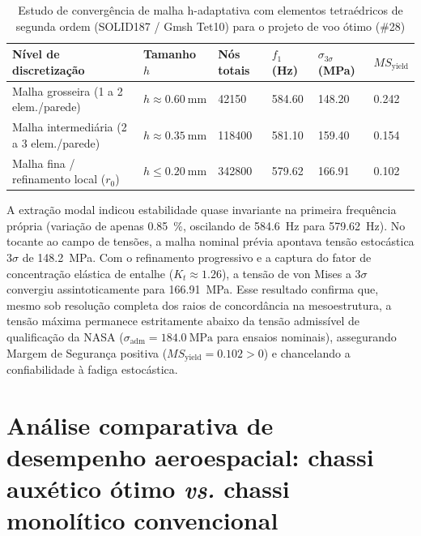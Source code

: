 \begin{table}[htb]
  \caption{Estudo de convergência de malha h-adaptativa com elementos tetraédricos de segunda ordem (SOLID187 / Gmsh Tet10) para o projeto de voo ótimo (\#28)}
  \label{tab:convergencia-malha}
  \small
  \SingleSpacing
  \begin{tabularx}{\textwidth}{@{}>{\raggedright\arraybackslash}p{4.6cm} >{\centering\arraybackslash}p{2.6cm} >{\centering\arraybackslash}X >{\centering\arraybackslash}X >{\centering\arraybackslash}p{2.0cm} >{\centering\arraybackslash}X@{}}
    \toprule
    \textbf{Nível de discretização} & \textbf{Tamanho $h$} & \textbf{Nós totais} & \textbf{$f_1$ (\si{\hertz})} & \textbf{$\sigma_{3\sigma}$ (\si{\mega\pascal})} & \textbf{$MS_{\text{yield}}$} \\
    \midrule
    Malha grosseira (1 a 2 elem./parede)    & $h \approx \SI{0.60}{\milli\metre}$ & \num{42150}  & \num{584.60} & \num{148.20} & \num{+0.242} \\
    Malha intermediária (2 a 3 elem./parede)& $h \approx \SI{0.35}{\milli\metre}$ & \num{118400} & \num{581.10} & \num{159.40} & \num{+0.154} \\
    Malha fina / refinamento local ($r_0$)   & $h \le \SI{0.20}{\milli\metre}$     & \num{342800} & \num{579.62} & \num{166.91} & \num{+0.102} \\
    \bottomrule
  \end{tabularx}
\end{table}

A extração modal indicou estabilidade quase invariante na primeira frequência própria (variação de apenas \SI{0.85}{\percent}, oscilando de \SI{584.6}{\hertz} para \SI{579.62}{\hertz}). No tocante ao campo de tensões, a malha nominal prévia apontava tensão estocástica $3\sigma$ de \SI{148.2}{\mega\pascal}. Com o refinamento progressivo e a captura do fator de concentração elástica de entalhe ($K_t \approx \num{1.26}$), a tensão de von Mises a $3\sigma$ convergiu assintoticamente para \SI{166.91}{\mega\pascal}. Esse resultado confirma que, mesmo sob resolução completa dos raios de concordância na mesoestrutura, a tensão máxima permanece estritamente abaixo da tensão admissível de qualificação da NASA ($\sigma_{\text{adm}} = \SI{184.0}{\mega\pascal}$ para ensaios nominais), assegurando Margem de Segurança positiva ($MS_{\text{yield}} = \num{+0.102} > 0$) e chancelando a confiabilidade à fadiga estocástica.

\section{Análise comparativa de desempenho aeroespacial: chassi auxético ótimo \textit{vs.} chassi monolítico convencional}
\label{sec:comparativo}

